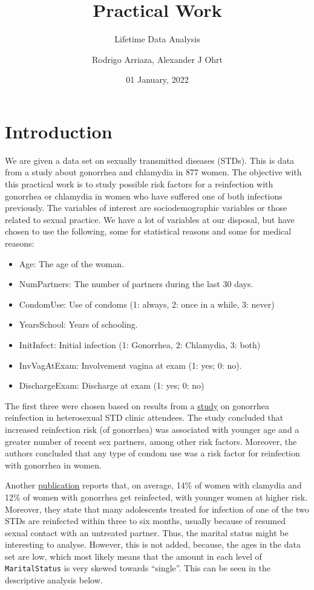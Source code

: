 \documentclass[
]{article}
\title{Practical Work}
\subtitle{Lifetime Data Analysis}
\author{Rodrigo Arriaza, Alexander J Ohrt}
\date{01 January, 2022}
\providecommand{\tightlist}{%
  \setlength{\itemsep}{0pt}\setlength{\parskip}{0pt}}
\begin{document}
\maketitle

\hypertarget{introduction}{%
\section{Introduction}\label{introduction}}

We are given a data set on sexually transmitted diseases (STDs). This is data from a study about gonorrhea and chlamydia in 877 women. The objective with this practical work is to study possible risk factors for a reinfection with gonorrhea or chlamydia in women who have suffered one of both infections previously. The variables of interest are sociodemographic variables or those related to sexual practice. We have a lot of variables at our disposal, but have chosen to use the following, some for statistical reasons and some for medical reasons:

\begin{itemize}
\tightlist
\item
  Age: The age of the woman.
\item
  NumPartners: The number of partners during the last 30 days.
\item
  CondomUse: Use of condoms (1: always, 2: once in a while, 3: never)
\item
  YearsSchool: Years of schooling.
\item
  InitInfect: Initial infection (1: Gonorrhea, 2: Chlamydia, 3: both)
\item
  InvVagAtExam: Involvement vagina at exam (1: yes; 0: no).
\item
  DischargeExam: Discharge at exam (1: yes; 0: no)
\end{itemize}

The first three were chosen based on results from a \href{https://www.ncbi.nlm.nih.gov/pmc/articles/PMC1744639/}{study} on gonorrhea reinfection in heterosexual STD clinic attendees. The study concluded that increased reinfection risk (of gonorrhea) was associated with younger age and a greater number of recent sex partners, among other risk factors. Moreover, the authors concluded that any type of condom use was a risk factor for reinfection with gonorrhea in women.

Another \href{https://policylab.chop.edu/sites/default/files/pdf/publications/Preventing_Chlamydia_Gonorrhea_Reinfection_through_Increased_Use_of_EPT.pdf}{publication} reports that, on average, 14\% of women with clamydia and 12\% of women with gonorrhea get reinfected, with younger women at higher risk. Moreover, they state that many adolescents treated for infection of one of the two STDs are reinfected within three to six months, usually because of resumed sexual contact with an untreated partner. Thus, the marital status might be interesting to analyse. However, this is not added, because, the ages in the data set are low, which most likely means that the amount in each level of \texttt{MaritalStatus} is very skewed towards ``single''. This can be seen in the descriptive analysis below.
\end{document}
